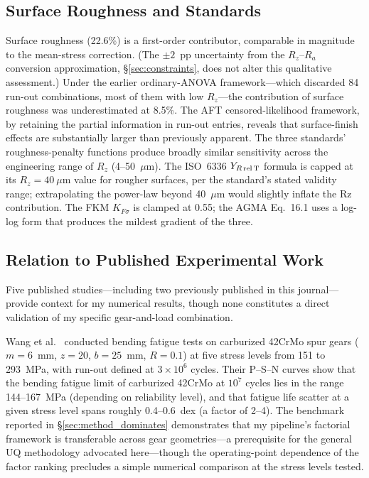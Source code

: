 \documentclass[twocolumn,12pt,a4paper]{article}
\begin{document}
\subsection{Surface Roughness and Standards}

Surface roughness (22.6\%) is a first-order contributor, comparable in
magnitude to the mean-stress correction. (The $\pm 2$~pp uncertainty
from the $R_z$--$R_a$ conversion approximation,
\S\ref{sec:constraints}, does not alter this qualitative assessment.)
Under the earlier ordinary-ANOVA
framework---which discarded 84 run-out combinations, most of them with
low $R_z$---the contribution of surface roughness was underestimated at
8.5\%. The AFT censored-likelihood framework, by retaining the partial
information in run-out entries, reveals that surface-finish effects are
substantially larger than previously apparent. The three standards'
roughness-penalty functions produce broadly similar sensitivity across
the engineering range of $R_z$ (4--50~$\mu$m). The ISO~6336
$Y_{R\,\rm rel\,T}$ formula is capped at its $R_z=40~\mu$m value for
rougher surfaces, per the standard's stated validity range; extrapolating
the power-law beyond 40~$\mu$m would slightly inflate the Rz contribution.
The FKM $K_{F\sigma}$ is clamped at 0.55; the AGMA Eq.~16.1 uses a
log-log form that produces the mildest gradient of the three.

\subsection{Relation to Published Experimental Work}
\label{sec:published}

Five published studies---including two previously published in
this journal---provide context for my numerical results, though
none constitutes a direct validation of my specific
gear-and-load combination.

Wang et al.~\cite{wang2023} conducted bending fatigue tests on
carburized 42CrMo spur gears ($m{=}6$~mm, $z{=}20$, $b{=}25$~mm,
$R{=}0.1$) at five stress levels from 151 to 293~MPa, with run-out
defined at $3\times10^6$ cycles. Their P--S--N curves show that the
bending fatigue limit of carburized 42CrMo at $10^7$ cycles lies in the
range 144--167~MPa (depending on reliability level), and that fatigue
life scatter at a given stress level spans roughly 0.4--0.6~dex (a
factor of 2--4). The
benchmark reported in \S\ref{sec:method_dominates} demonstrates that
my pipeline's factorial framework is transferable across gear geometries---a
prerequisite for the general UQ methodology advocated here---though the
operating-point dependence of the factor ranking precludes a simple
numerical comparison at the stress levels tested.
\end{document}
